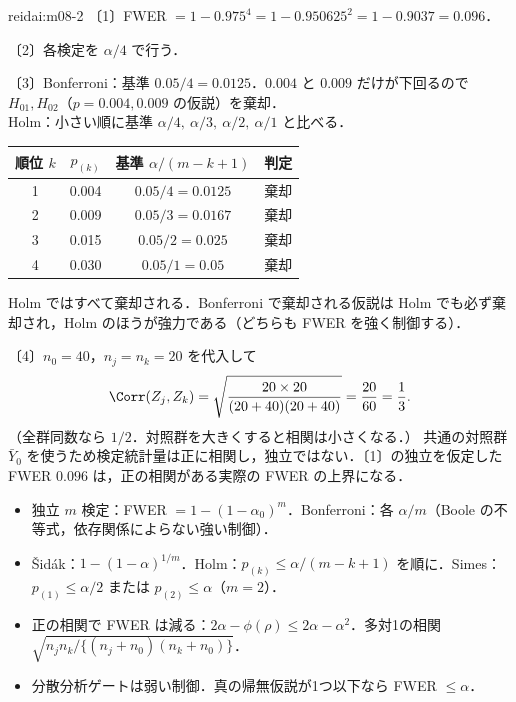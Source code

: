 \begin{kaitou}{reidai:m08-2}
〔1〕FWER $=1-0.975^4=1-0.950625^2=1-0.9037=0.096$．

〔2〕各検定を $\alpha/4$ で行う．

〔3〕Bonferroni：基準 $0.05/4=0.0125$．$0.004$ と $0.009$ だけが下回るので $H_{01},H_{02}$（$p=0.004,0.009$ の仮説）を棄却．\\
Holm：小さい順に基準 $\alpha/4,\ \alpha/3,\ \alpha/2,\ \alpha/1$ と比べる．
\begin{center}\small
\begin{tabular}{@{}cccc@{}}
\toprule
順位 $k$ & $p_{(k)}$ & 基準 $\alpha/(m-k+1)$ & 判定\\
\midrule
1 & 0.004 & $0.05/4=0.0125$ & 棄却\\
2 & 0.009 & $0.05/3=0.0167$ & 棄却\\
3 & 0.015 & $0.05/2=0.025$ & 棄却\\
4 & 0.030 & $0.05/1=0.05$ & 棄却\\
\bottomrule
\end{tabular}
\end{center}
Holm ではすべて棄却される．Bonferroni で棄却される仮説は Holm でも必ず棄却され，Holm のほうが強力である（どちらも FWER を強く制御する）．

〔4〕$n_0=40$，$n_j=n_k=20$ を代入して
\[
\Corr(Z_j,Z_k)=\sqrt{\frac{20\times20}{(20+40)(20+40)}}=\frac{20}{60}=\frac13 .
\]
（全群同数なら $1/2$．対照群を大きくすると相関は小さくなる．）
共通の対照群 $\bar Y_0$ を使うため検定統計量は正に相関し，独立ではない．〔1〕の独立を仮定した FWER $0.096$ は，正の相関がある実際の FWER の上界になる．
\end{kaitou}

\begin{summarybox}
\begin{itemize}
\item 独立 $m$ 検定：FWER $=1-(1-\alpha_0)^m$．Bonferroni：各 $\alpha/m$（Boole の不等式，依存関係によらない強い制御）．
\item Šidák：$1-(1-\alpha)^{1/m}$．Holm：$p_{(k)}\le\alpha/(m-k+1)$ を順に．Simes：$p_{(1)}\le\alpha/2$ または $p_{(2)}\le\alpha$（$m=2$）．
\item 正の相関で FWER は減る：$2\alpha-\phi(\rho)\le2\alpha-\alpha^2$．多対1の相関 $\sqrt{n_jn_k/\{(n_j+n_0)(n_k+n_0)\}}$．
\item 分散分析ゲートは弱い制御．真の帰無仮説が1つ以下なら FWER $\le\alpha$．
\end{itemize}
\end{summarybox}
